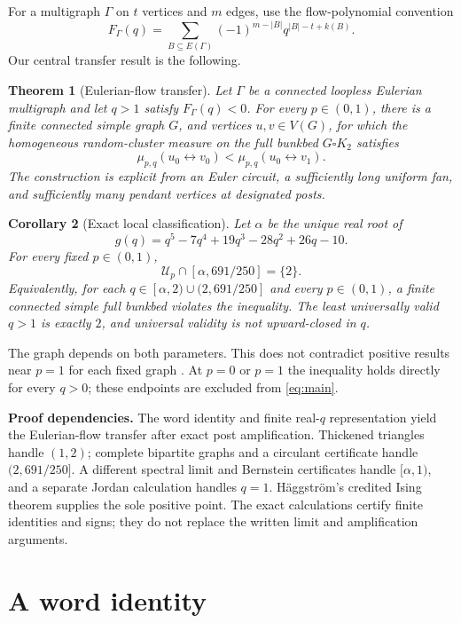 \documentclass[11pt,a4paper]{article}
\newtheorem{theorem}{Theorem}[section]
\newtheorem{corollary}[theorem]{Corollary}
\theoremstyle{remark}\newtheorem{remark}[theorem]{Remark}
\newcommand{\bb}{\square K_2}
\begin{document}
For a multigraph $\Gamma$ on $t$ vertices and $m$ edges, use the flow-polynomial convention
\begin{equation}\label{eq:flow}
F_\Gamma(q)=\sum_{B\subseteq E(\Gamma)}(-1)^{m-|B|}q^{|B|-t+k(B)}.
\end{equation}
Our central transfer result is the following.
\begin{theorem}[Eulerian-flow transfer]\label{thm:transfer}
Let $\Gamma$ be a connected loopless Eulerian multigraph and let $q>1$ satisfy $F_\Gamma(q)<0$. For every $p\in(0,1)$, there is a finite connected simple graph $G$, and vertices $u,v\in V(G)$, for which the homogeneous random-cluster measure on the full bunkbed $G\bb$ satisfies
\[
\mu_{p,q}(u_0\leftrightarrow v_0)<\mu_{p,q}(u_0\leftrightarrow v_1).
\]
The construction is explicit from an Euler circuit, a sufficiently long uniform fan, and sufficiently many pendant vertices at designated posts.
\end{theorem}
\begin{corollary}[Exact local classification]\label{cor:main}
Let $\alpha$ be the unique real root of
\[
g(q)=q^5-7q^4+19q^3-28q^2+26q-10.
\]
For every fixed $p\in(0,1)$,
\begin{equation}\label{eq:main}
\boxed{\qquad \mathcal U_p\cap[\alpha,691/250]=\{2\}.\qquad}
\end{equation}
Equivalently, for each $q\in[\alpha,2)\cup(2,691/250]$ and every $p\in(0,1)$, a finite connected simple full bunkbed violates the inequality. The least universally valid $q>1$ is exactly $2$, and universal validity is not upward-closed in $q$.
\end{corollary}
The graph depends on both parameters. This does not contradict positive results near $p=1$ for each fixed graph \cite{ALR}. At $p=0$ or $p=1$ the inequality holds directly for every $q>0$; these endpoints are excluded from \eqref{eq:main}.

\textbf{Proof dependencies.} The word identity and finite real-$q$ representation yield the Eulerian-flow transfer after exact post amplification. Thickened triangles handle $(1,2)$; complete bipartite graphs and a circulant certificate handle $(2,691/250]$. A different spectral limit and Bernstein certificates handle $[\alpha,1)$, and a separate Jordan calculation handles $q=1$. H\"aggstr\"om's credited Ising theorem supplies the sole positive point. The exact calculations certify finite identities and signs; they do not replace the written limit and amplification arguments.

\section{A word identity}
\end{document}
